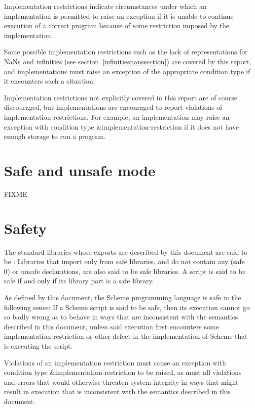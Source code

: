 Implementation restrictions indicate circumstances under which an
implementation is permitted to raise an exception if it is unable to
continue execution of a correct program because of some restriction
imposed by the implementation.

Some possible implementation restrictions
such as the lack of representations for NaNs and infinities (see
section~\ref{infinitiesnanssection}) are covered by this report, and
implementations must raise an exception of the appropriate condition
type if it encounters such a situation.

Implementation restrictions not explicitly covered in this report are
of course discouraged, but implementations are encouraged to report
violations of implementation restrictions. For example, an implementation may raise an exception
with condition type {\cf\&implementation-restriction} if it does not
have enough storage to run a program.


\section{Safe and unsafe mode}
\label{safeunsafemodesection}

FIXME

\section{Safety}

The standard libraries whose exports are described by this
document are said to be .  Libraries
that import only from safe libraries, and do not contain any
{\cf (safe 0)} or {\cf unsafe} declarations, are also said
to be safe libraries.  A script is said to be safe if and
only if its library part is a safe library.

As defined by this document, the Scheme programming language
is safe in the following sense:
If a Scheme script is said to be safe, then its execution
cannot go so badly wrong as to behave in ways that are
inconsistent with the semantics described in this document,
unless said execution first encounters some implementation
restriction or other defect in the implementation of Scheme
that is executing the script.

Violations of an implementation restriction must cause an exception
with condition type {\cf\&implementation-restriction} to be raised, as must all
violations and errors that would otherwise threaten system
integrity in ways that might result in execution that is
inconsistent with the semantics described in this document.


